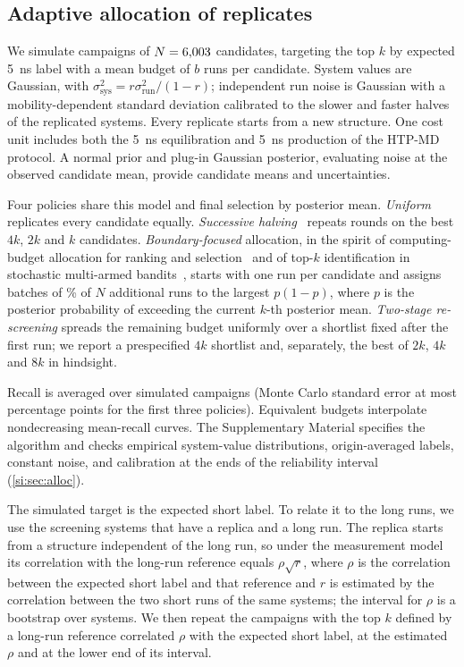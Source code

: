 \documentclass[preprint,12pt]{elsarticle}
\begin{document}
\subsection{Adaptive allocation of replicates}\label{sec:allocation-method}
We simulate campaigns of $N=6{,}003$ candidates, targeting the top $k$ by expected
\SI{5}{\nano\second} label with a mean budget of $b$ runs per candidate. System values are
Gaussian, with $\sigma_{\mathrm{sys}}^2=r\sigma_{\mathrm{run}}^2/(1-r)$; independent run noise
is Gaussian with a mobility-dependent standard deviation calibrated to the slower and faster
halves of the replicated systems. Every replicate starts from a new structure. One cost unit
includes both the \SI{5}{\nano\second} equilibration and \SI{5}{\nano\second} production of
the HTP-MD protocol. A normal prior and plug-in Gaussian posterior, evaluating noise at the
observed candidate mean, provide candidate means and uncertainties.

Four policies share this model and final selection by posterior mean. \emph{Uniform}
replicates every candidate equally. \emph{Successive halving}~\cite{Jamieson2016SuccessiveHalving}
repeats rounds on the best $4k$, $2k$ and $k$ candidates. \emph{Boundary-focused} allocation,
in the spirit of computing-budget allocation for ranking and selection~\cite{Kim2006SelectingBest,Chen2000OCBA,Chen2008OCBAm}
and of top-$k$ identification in stochastic multi-armed bandits~\cite{Kalyanakrishnan2012PAC},
starts with one run per candidate and assigns batches of \alBatchPct\% of $N$ additional runs
to the largest $p(1-p)$, where $p$ is the posterior probability of exceeding the current
$k$-th posterior mean. \emph{Two-stage re-screening} spreads the remaining budget uniformly
over a shortlist fixed after the first run; we report a prespecified $4k$ shortlist and,
separately, the best of $2k$, $4k$ and $8k$ in hindsight.

Recall is averaged over \alReps{} simulated campaigns (Monte Carlo standard error at most
\alMCErrMax{} percentage points for the first three policies). Equivalent budgets interpolate
nondecreasing mean-recall curves. The Supplementary Material specifies the algorithm and checks
empirical system-value distributions, origin-averaged labels, constant noise, and calibration
at the ends of the reliability interval (\cref{si:sec:alloc}).

The simulated target is the expected short label. To relate it to the long runs, we use the
\olN{} screening systems that have a replica and a long run. The replica starts from a structure
independent of the long run, so under the measurement model its correlation with the long-run
reference equals $\rho\sqrt{r}$, where $\rho$ is the correlation between the expected short
label and that reference and $r$ is estimated by the correlation between the two short runs of
the same systems; the interval for $\rho$ is a bootstrap over systems. We then repeat the
campaigns with the top $k$ defined by a long-run reference correlated $\rho$ with the expected
short label, at the estimated $\rho$ and at the lower end of its interval.
\end{document}
